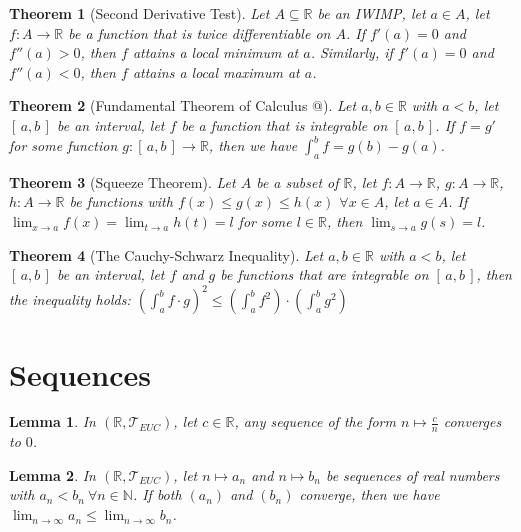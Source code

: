 \documentclass[11pt]{article}
\makeatletter
\theoremstyle{break}
\theoremstyle{break}
\newtheorem{thm}{Theorem}[section]
\newtheorem{lem}{Lemma}[thm]
\newcommand{\R}{\mathbb{R}}
\newcommand{\N}{\mathbb{N}}
\newcommand{\T}{\mathcal{T}}
\newcommand{\Intab}{[\,a,b\,]}
\newcommand*{\rom}[1]{\expandafter\@slowromancap\romannumeral #1@}
\makeatother
\begin{document}
	\begin{thm}[Second Derivative Test]
		Let $A \subseteq \R$ be an IWIMP, let $a \in A$, let $f:A \to \R$ be a function that is twice differentiable on $A$. If $f'(a)=0$ and $f''(a)>0$, then $f$ attains a local minimum at $a$. Similarly, if $f'(a)=0$ and $f''(a)<0$, then $f$ attains a local maximum at $a$.
	\end{thm}
	
	\begin{thm}[Fundamental Theorem of Calculus \rom{2}]
		Let $a,b \in \R$ with $a<b$, let $\Intab$ be an interval, let $f$ be a function that is integrable on $\Intab$. If $f=g'$ for some function $g:\Intab \to \R$, then we have $\int_a^b f = g(b)-g(a)$.
	\end{thm}

	\begin{thm}[Squeeze Theorem]
		Let $A$ be a subset of $\R$, let $f:A \to \R$, $g:A \to \R$, $h:A \to \R$ be functions with \mbox{$f(x) \leq g(x) \leq h(x) $} $\forall x \in A$, let $a \in A$. If $\lim_{x \to a} f(x) = \lim_{t \to a}h(t)=l$ for some $l \in \R$, then $\lim_{s \to a}g(s)=l$.
	\end{thm}
	
	\begin{thm}[The Cauchy-Schwarz Inequality]
		Let $a,b \in \R$ with $a<b$, let $\Intab$ be an interval, let $f$ and $g$ be functions that are integrable on $\Intab$, then the inequality holds: $(\int_a^b f \cdot g )^2 \leq (\int_a^b f^2)\cdot (\int_a^b g^2)$
	\end{thm}

	
\clearpage













\section{\color{red} Sequences}

	\begin{lem}
		In $(\R,\T_{EUC})$, let $c \in \R$, any sequence of the form $n \mapsto \frac{c}{n}$ converges to $0$.
	\end{lem}
	
	\begin{lem}
		In $(\R,\T_{EUC})$, let $n \mapsto a_n$ and $n \mapsto b_n$ be sequences of real numbers with $a_n < b_n \ \forall n \in \N$. If both $(a_n)$ and $(b_n)$ converge, then we have $\lim_{n \to \infty} a_n \leq \lim_{n \to \infty} b_n$.
	\end{lem}
	
\end{document}
